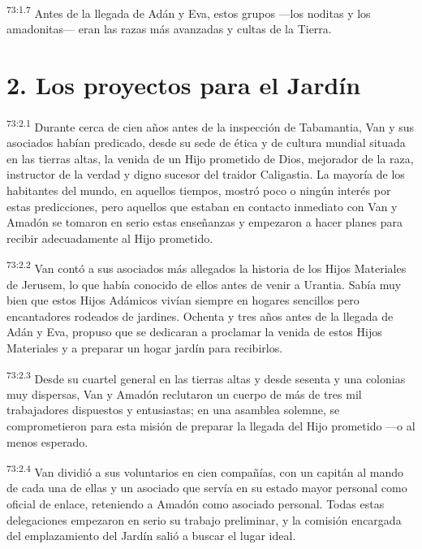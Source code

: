 \par
\textsuperscript{73:1.7} Antes de la llegada de Adán y Eva, estos grupos ---los noditas y los amadonitas--- eran las razas más avanzadas y cultas de la Tierra.

\section*{2. Los proyectos para el Jardín}
\par
\textsuperscript{73:2.1} Durante cerca de cien años antes de la inspección de Tabamantia, Van y sus asociados habían predicado, desde su sede de ética y de cultura mundial situada en las tierras altas, la venida de un Hijo prometido de Dios, mejorador de la raza, instructor de la verdad y digno sucesor del traidor Caligastia. La mayoría de los habitantes del mundo, en aquellos tiempos, mostró poco o ningún interés por estas predicciones, pero aquellos que estaban en contacto inmediato con Van y Amadón se tomaron en serio estas enseñanzas y empezaron a hacer planes para recibir adecuadamente al Hijo prometido.

\par
\textsuperscript{73:2.2} Van contó a sus asociados más allegados la historia de los Hijos Materiales de Jerusem, lo que había conocido de ellos antes de venir a Urantia. Sabía muy bien que estos Hijos Adámicos vivían siempre en hogares sencillos pero encantadores rodeados de jardines. Ochenta y tres años antes de la llegada de Adán y Eva, propuso que se dedicaran a proclamar la venida de estos Hijos Materiales y a preparar un hogar jardín para recibirlos.

\par
\textsuperscript{73:2.3} Desde su cuartel general en las tierras altas y desde sesenta y una colonias muy dispersas, Van y Amadón reclutaron un cuerpo de más de tres mil trabajadores dispuestos y entusiastas; en una asamblea solemne, se comprometieron para esta misión de preparar la llegada del Hijo prometido ---o al menos esperado.

\par
\textsuperscript{73:2.4} Van dividió a sus voluntarios en cien compañías, con un capitán al mando de cada una de ellas y un asociado que servía en su estado mayor personal como oficial de enlace, reteniendo a Amadón como asociado personal. Todas estas delegaciones empezaron en serio su trabajo preliminar, y la comisión encargada del emplazamiento del Jardín salió a buscar el lugar ideal.

